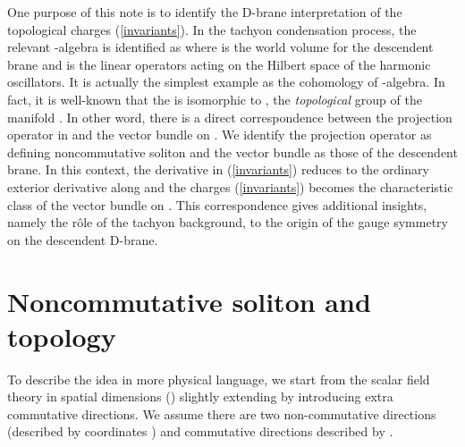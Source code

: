 \documentclass[a4paper,12pt]{article}
\begin{document}
One purpose of this note is to identify the
D-brane interpretation of the topological charges
(\ref{invariants}). In the tachyon condensation process,
the relevant \coordHE{}-algebra is identified as
\coordHE{} where \coordHE{} is the world
volume for the descendent brane and \myHighlight{$\cB(\cH)$}\coordHE{} is the
linear operators acting on the Hilbert space \myHighlight{$\cH$}\coordHE{}
of the harmonic oscillators. 
It is actually the simplest example as the cohomology
of \coordHE{}-algebra. In fact, it is well-known \cite{r:WO} that
the \coordHE{} is isomorphic to
\coordHE{}, the {\em topological} \coordHE{}  group of the manifold \coordHE{}.
In other word, there is a direct correspondence between
the projection operator in \coordHE{} and
the vector bundle on \coordHE{}. We identify the projection
operator as defining noncommutative soliton and
the vector bundle as those of the descendent brane.
In this context, the derivative \coordHE{} in (\ref{invariants})
reduces to the ordinary exterior derivative along \coordHE{} and the
charges (\ref{invariants}) becomes the characteristic
class of the vector bundle on \coordHE{}.
This correspondence gives additional
insights, namely the r\^ole of the tachyon background,
to the origin of the gauge symmetry on the descendent D-brane.


\section{Noncommutative soliton and topology}
To describe the idea in more physical language,
we start from the scalar field theory in 
\coordHE{} spatial dimensions
(\coordHE{}) slightly extending \cite{r:GMS} by
introducing extra commutative directions.
We assume there are two non-commutative 
directions (described by coordinates \coordHE{})
and \coordHE{} commutative directions described by \coordHE{}.
\end{document}
